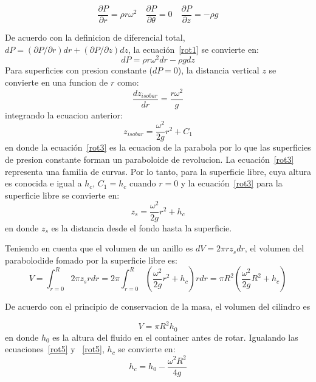 \documentclass[10pt, oneside]{article}
\begin{document}
\begin{equation}
\frac{\partial P}{\partial r} = \rho r \omega^2 \quad \frac{\partial P}{\partial \theta} = 0 \quad \frac{\partial P}{\partial z} = -\rho g
\label{rot1}
\end{equation}

De acuerdo con la definicion de diferencial total, $dP = (\partial P / \partial r)dr + (\partial P / \partial z)dz$, la ecuaci\'on~\ref{rot1} se convierte en:
\begin{equation}
dP = \rho r \omega^2 dr - \rho g dz
\label{rot2}
\end{equation}
Para superficies con presion constante ($dP = 0$), la distancia vertical $z$ se convierte en una funcion de $r$ como:
$$
\frac{d z_{isobar}}{dr} = \frac{r \omega^2}{g}
$$
integrando la ecuacion anterior:
\begin{equation}
z_{isobar} = \frac{\omega^2}{2g} r^2 + C_1
\label{rot3}
\end{equation}
en donde la ecuaci\'on~\ref{rot3} es la ecuacion de la parabola por lo que las superficies de presion constante forman un paraboloide de revolucion. La ecuaci\'on~\ref{rot3} representa una familia de curvas. Por lo tanto, para la superficie libre, cuya altura es conocida e igual a $h_c$, $C_1=h_c$ cuando $r=0$ y la ecuaci\'on~\ref{rot3} para la superficie libre se convierte en:
\begin{equation}
z_s = \frac{\omega^2}{2g} r^2 + h_c
\label{rot4}
\end{equation}
en donde $z_s$ es la distancia desde el fondo hasta la superficie. 

Teniendo en cuenta que el volumen de un anillo es $dV = 2\pi r z_s dr$, el volumen del parabolodide fomado por la superficie libre es:
\begin{equation}
V = \int_{r=0}^R 2\pi z_s r dr = 2\pi \int_{r=0}^R \left( \frac{\omega^2}{2g} r^2 + h_c \right) r dr = \pi R^2 \left( \frac{\omega^2}{2g} R^2 + h_c \right)
\label{rot5}
\end{equation}

De acuerdo con el principio de conservacion de la masa, el volumen del cilindro es

\begin{equation}
V=\pi R^2 h_0
\label{rot6}
\end{equation}
en donde $h_0$ es la altura del fluido en el container antes de rotar. Igualando las ecuaciones~\ref{rot5} y ~\ref{rot5}, $h_c$ se convierte en:
\begin{equation}
h_c = h_0 - \frac{\omega^2 R^2}{4g}
\label{rot7}
\end{equation}
\end{document}
